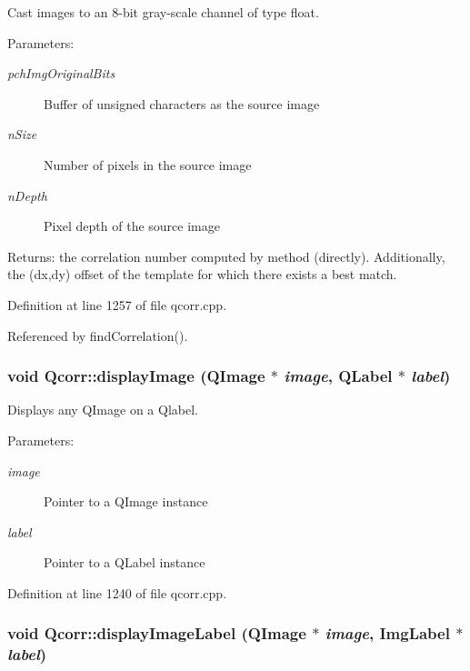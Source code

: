Cast images to an 8-bit gray-scale channel of type float. 

\begin{Desc}
\item[Parameters:]
\begin{description}
\item[{\em pchImgOriginalBits}]Buffer of unsigned characters as the source image \item[{\em nSize}]Number of pixels in the source image \item[{\em nDepth}]Pixel depth of the source image \end{description}
\end{Desc}
\begin{Desc}
\item[Returns:]the correlation number computed by method (directly). Additionally, the (dx,dy) offset of the template for which there exists a best match. \end{Desc}


Definition at line 1257 of file qcorr.cpp.

Referenced by findCorrelation().\hypertarget{classQcorr_925b0715143a0afa981851547f8b9256}{
\subsubsection[{displayImage}]{\setlength{\rightskip}{0pt plus 5cm}void Qcorr::displayImage (QImage $\ast$ {\em image}, \/  QLabel $\ast$ {\em label})}}
\label{classQcorr_925b0715143a0afa981851547f8b9256}


Displays any QImage on a Qlabel. 

\begin{Desc}
\item[Parameters:]
\begin{description}
\item[{\em image}]Pointer to a QImage instance \item[{\em label}]Pointer to a QLabel instance \end{description}
\end{Desc}


Definition at line 1240 of file qcorr.cpp.\hypertarget{classQcorr_fddb022a6024a32be3b47016308d6c50}{
\subsubsection[{displayImageLabel}]{\setlength{\rightskip}{0pt plus 5cm}void Qcorr::displayImageLabel (QImage $\ast$ {\em image}, \/  {\bf ImgLabel} $\ast$ {\em label})}}
\label{classQcorr_fddb022a6024a32be3b47016308d6c50}


